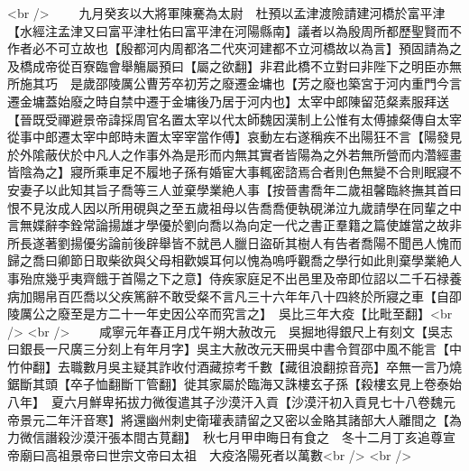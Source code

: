 <br />
　　九月癸亥以大將軍陳騫為太尉　杜預以孟津渡險請建河橋於富平津【水經注孟津又曰富平津杜佑曰富平津在河陽縣南】議者以為殷周所都歷聖賢而不作者必不可立故也【殷都河内周都洛二代夾河建都不立河橋故以為言】預固請為之及橋成帝從百寮臨會舉觴屬預曰【屬之欲翻】非君此橋不立對曰非陛下之明臣亦無所施其巧　是歲邵陵厲公曹芳卒初芳之廢遷金墉也【芳之廢也築宮于河内重門今言遷金墉蓋始廢之時自禁中遷于金墉後乃居于河内也】太宰中郎陳留范粲素服拜送【晉既受禪避景帝諱採周官名置太宰以代太師魏因漢制上公惟有太傅據粲傳自太宰從事中郎遷太宰中郎時未置太宰宰當作傅】哀動左右遂稱疾不出陽狂不言【陽發見於外隂蔽伏於中凡人之作事外為是形而内無其實者皆陽為之外若無所營而内濳經畫皆陰為之】寢所乘車足不履地子孫有婚宦大事輒密諮焉合者則色無變不合則眠寢不安妻子以此知其旨子喬等三人並棄學業絶人事【按晉書喬年二歲祖馨臨終撫其首曰恨不見汝成人因以所用硯與之至五歲祖母以告喬喬便執硯涕泣九歲請學在同輩之中言無媟辭李銓常論揚雄才學優於劉向喬以為向定一代之書正羣籍之篇使雄當之故非所長遂著劉揚優劣論前後辟舉皆不就邑人臘日盜斫其樹人有告者喬陽不聞邑人愧而歸之喬曰卿節日取柴欲與父母相歡娛耳何以愧為嗚呼觀喬之學行如此則棄學業絶人事殆庶幾乎夷齊餓于首陽之下之意】侍疾家庭足不出邑里及帝即位詔以二千石禄養病加賜帛百匹喬以父疾篤辭不敢受粲不言凡三十六年年八十四終於所寢之車【自卲陵厲公之廢至是方二十一年史因公卒而究言之】　吳比三年大疫【比毗至翻】<br />
<br />
　　咸寧元年春正月戊午朔大赦改元　吳掘地得銀尺上有刻文【吳志曰銀長一尺廣三分刻上有年月字】吳主大赦改元天冊吳中書令賀邵中風不能言【中竹仲翻】去職數月吳主疑其詐收付酒藏掠考千數【藏徂浪翻掠音亮】卒無一言乃燒鋸斷其頭【卒子恤翻斷丅管翻】徙其家屬於臨海又誅樓玄子孫【殺樓玄見上卷泰始八年】　夏六月鮮卑拓拔力微復遣其子沙漠汗入貢【沙漠汗初入貢見七十八卷魏元帝景元二年汗音寒】將還幽州刺史衛瓘表請留之又密以金賂其諸部大人離間之【為力微信譖殺沙漠汗張本間古莧翻】　秋七月甲申晦日有食之　冬十二月丁亥追尊宣帝廟曰高祖景帝曰世宗文帝曰太祖　大疫洛陽死者以萬數<br />
<br />

